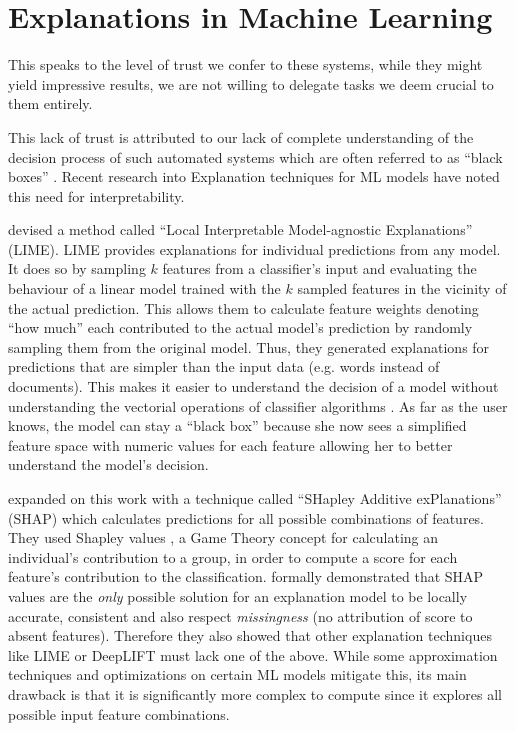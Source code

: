 \documentclass[\version]{l4proj}
\begin{document}
\section{Explanations in Machine Learning}

This speaks to the level of trust we confer to these systems, while they might yield impressive results, we are not willing to delegate tasks we deem crucial to them entirely.

This lack of trust is attributed to our lack of complete understanding of the decision process of such automated systems which are often referred to as ``black boxes'' \autocite{ribeiroWhyShouldTrust2016}.
Recent research into Explanation techniques for ML models have noted this need for interpretability.

\textcite{ribeiroWhyShouldTrust2016} devised a method called ``Local Interpretable Model-agnostic Explanations'' (LIME).
LIME provides explanations for individual predictions from any model.
It does so by sampling $k$ features from a classifier's input and evaluating the behaviour of a linear model trained with the $k$ sampled features in the vicinity of the actual prediction.
This allows them to calculate feature weights denoting ``how much'' each contributed to the actual model's prediction by randomly sampling them from the original model.
Thus, they generated explanations for predictions that are simpler than the input data (e.g. words instead of documents).
This makes it easier to understand the decision of a model without understanding the vectorial operations of classifier algorithms .
As far as the user knows, the model can stay a ``black box'' because she now sees a simplified feature space with numeric values for each feature allowing her to better understand the model's decision.

\textcite{lundbergUnifiedApproachInterpreting2017} expanded on this work with a technique called ``SHapley Additive exPlanations'' (SHAP) which calculates predictions for all possible combinations of features.
They used Shapley values \autocite{shapleyNotesNPersonGame1951}, a Game Theory concept for calculating an individual's contribution to a group, in order to compute a score for each feature's contribution to the classification.
\textcite{lundbergUnifiedApproachInterpreting2017} formally demonstrated that SHAP values are the \textit{only} possible solution for an explanation model to be locally accurate, consistent and also respect \textit{missingness} (no attribution of score to absent features).
Therefore they also showed that other explanation techniques like LIME or DeepLIFT must lack one of the above.
While some approximation techniques and optimizations on certain ML models mitigate this, its main drawback is that it is significantly more complex to compute since it explores all possible input feature combinations.
\end{document}
